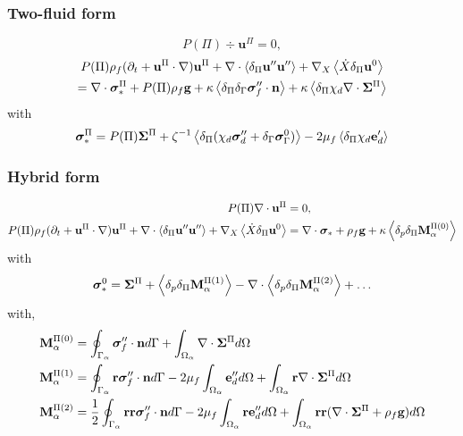 \documentclass[12pt]{My_preprint}
\begin{document}
\subsubsection{Two-fluid form}
\begin{equation}
    P(\Pi) \div \textbf{u}^\Pi = 0,
\end{equation}
\begin{multline}
    P(\Pi) \rho_f(\partial_t 
   + \textbf{u}^\Pi \cdot \mathbf{\nabla}) \textbf{u}^\Pi
   + \mathbf{\nabla}\cdot \left<\delta_\Pi \textbf{u}''\textbf{u}''\right>
   + \mathbf{\nabla}_X \left<\dot{X} \delta_\Pi \textbf{u}^0\right>\\
   = 
   \mathbf{\nabla}\cdot \bm\sigma_*^\Pi
   +P(\Pi)\rho_f \textbf{g}
   +\kappa\left<\delta_\Pi \delta_\Gamma\bm\sigma_f''\cdot \textbf{n}\right>
   +\kappa\left<\delta_\Pi \chi_d \mathbf{\nabla}\cdot \bm\Sigma^\Pi\right>
\end{multline}
with 
\begin{equation}
   \bm\sigma_*^\Pi = 
   P(\Pi)\bm\Sigma^\Pi
   + \zeta^{-1}\left<\delta_\Pi(\chi_d \bm\sigma_d''
   + \delta_\Gamma \bm\sigma_\Gamma^0)\right>
   -  2\mu_f\left<\delta_\Pi \chi_d   \textbf{e}_d'\right>
\end{equation}
\subsubsection{Hybrid form}
\begin{align}
    P(\Pi) \mathbf{\nabla}\cdot \textbf{u}^\Pi &= 0, \\
    P(\Pi) \rho_f(\partial_t 
   + \textbf{u}^\Pi \cdot \mathbf{\nabla}) \textbf{u}^\Pi
   + \mathbf{\nabla}\cdot \left<\delta_\Pi \textbf{u}''\textbf{u}''\right>
   + \mathbf{\nabla}_X \left<\dot{X} \delta_\Pi \textbf{u}^0\right>
   &= 
   \mathbf{\nabla}\cdot \bm\sigma_*
   +\rho_f \textbf{g}
   +\kappa\left<\delta_{p} \delta_\Pi\textbf{M}_\alpha^{\Pi(0)}\right>
\end{align}
with 
\begin{equation}
    \bm\sigma_*^0 = 
    \bm\Sigma^\Pi
    + \left<\delta_{p} \delta_\Pi\textbf{M}_\alpha^{\Pi(1)}\right>
    - \mathbf{\nabla}\cdot \left<\delta_{p} \delta_\Pi\textbf{M}_\alpha^{\Pi(2)}\right>
    + \ldots
\end{equation}
with,
\begin{align}
    \textbf{M}_\alpha^{\Pi(0)} &=
    \oint_{\Gamma_{\alpha}} \bm{\sigma}_f'' \cdot \textbf{n} d\Gamma
   +\int_{\Omega_{\alpha}} \mathbf{\nabla}\cdot \bm\Sigma^\Pi d\Omega
   \\
   \textbf{M}_\alpha^{\Pi(1)} &=
   \oint_{\Gamma_{\alpha}} \textbf{r}\bm{\sigma}_f'' \cdot \textbf{n} d\Gamma
   -2\mu_f \int_{\Omega_{\alpha}} \textbf{e}_d'' d\Omega
   +\int_{\Omega_{\alpha}} \textbf{r}\mathbf{\nabla}\cdot \bm\Sigma^\Pi d\Omega
   \\
   \textbf{M}_\alpha^{\Pi(2)} &=
   \frac{1}{2}\oint_{\Gamma_{\alpha}} \textbf{rr}\bm{\sigma}_f'' \cdot \textbf{n} d\Gamma
   -2\mu_f \int_{\Omega_{\alpha}} \textbf{re}_d'' d\Omega
   +\int_{\Omega_{\alpha}} \textbf{rr}(\mathbf{\nabla}\cdot \bm\Sigma^\Pi+ \rho_f\textbf{g}) d\Omega
    \\
\end{align}
\end{document}
